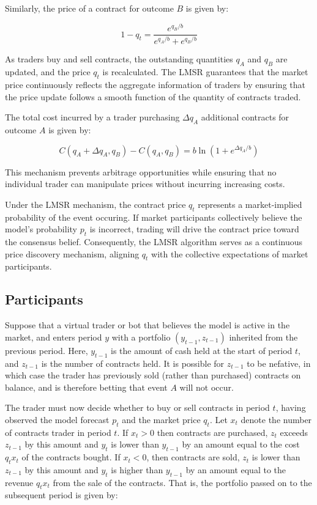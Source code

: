Similarly, the price of a contract for outcome $B$ is given by:

\begin{equation}
    1 - q_t = \frac{e^{q_B / b}}{e^{q_A / b} + e^{q_B / b}}
\end{equation}

As traders buy and sell contracts, the outstanding quantities 
$q_A$ and $q_B$ are updated, and the price $q_t$ is recalculated.
The LMSR guarantees that the market price continuously 
reflects the aggregate information of traders by ensuring that the price 
update follows a smooth function of the quantity of contracts traded.

The total cost incurred by a trader purchasing $\Delta q_A$ additional 
contracts for outcome $A$ is given by:

\begin{equation}
    C(q_A + \Delta q_A, q_B) - C(q_A, q_B) = b \ln (1 + e^{\Delta q_A / b})
\end{equation}

This mechanism prevents arbitrage opportunities while ensuring that no individual 
trader can manipulate prices without incurring increasing costs. 

Under the LMSR mechanism, the contract price $q_t$ represents 
a market-implied probability of the event occuring. If market participants 
collectively believe the model's probability $p_t$ is incorrect, 
trading will drive the contract price toward the consensus belief. 
Consequently, the LMSR algorithm serves as a continuous 
price discovery mechanism, aligning $q_t$ with the collective
expectations of market participants.

\subsection{Participants}

Suppose that a virtual trader or bot that believes the model is active 
in the market, and enters period $y$ with a portfolio $(y_{t-1}, z_{t-1})$
inherited from the previous period. Here, $y_{t-1}$ is the amount of cash held 
at the start of period $t$, and $z_{t-1}$ is the number of contracts held. It 
is possible for $z_{t-1}$ to be nefative, in which case the trader has 
previously sold (rather than purchased) contracts on balance, and is 
therefore betting that event $A$ will not occur.

The trader must now decide whether to buy or sell contracts in period $t$,
having observed the model forecast $p_t$ and the market price $q_t$. 
Let $x_t$ denote the number of contracts trader in period $t$. 
If $x_t > 0$ then contracts are purchased, $z_t$ exceeds $z_{t-1}$ by this amount 
and $y_t$ is lower than $y_{t-1}$ by an amount equal to the cost 
$q_t x_t$ of the contracts bought. 
If $x_t < 0$, then contracts are sold, $z_t$ is lower than $z_{t-1}$ by this 
amount and $y_t$ is higher than $y_{t-1}$ by an amount equal to the 
revenue $q_t x_t$ from the sale of the contracts. That is, the portfolio 
passed on to the subsequent period is given by:

